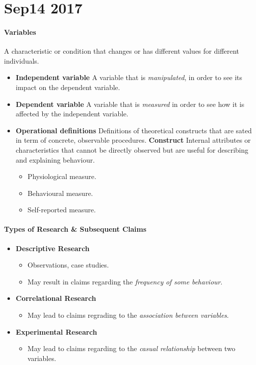 \documentclass{article}
\begin{document}
	\section{Sep14 2017}
	\paragraph{Variables} A characteristic or condition that changes or has different values for different individuals.
	\begin{itemize}
		\item \textbf{Independent variable} A variable that is \emph{manipulated}, in order to see its impact on the dependent variable.
		\item \textbf{Dependent variable} A variable that is \emph{measured} in order to see how it is affected by the independent variable.
		\item \textbf{Operational definitions} Definitions of theoretical constructs that are sated in term of concrete, observable procedures.
			\newline \textbf{Construct} Internal attributes or characteristics that cannot be directly observed but are useful for describing and explaining behaviour.
			\begin{itemize}
				\item Physiological measure.
				\item Behavioural measure.
				\item Self-reported measure.
			\end{itemize}
	\end{itemize}
	\paragraph{Types of Research \& Subsequent Claims}
	\begin{itemize}
		\item \textbf{Descriptive Research}
		\begin{itemize}
			\item Observations, case studies.
			\item May result in claims regarding the \emph{frequency of some behaviour}.
		\end{itemize}
		\item \textbf{Correlational Research}
		\begin{itemize}
			\item May lead to claims regrading to the \emph{association between variables}.
		\end{itemize}
		\item \textbf{Experimental Research}
		\begin{itemize}
			\item May lead to claims regarding to the \emph{casual relationship} between two variables.
		\end{itemize}
	\end{itemize}
\end{document}
